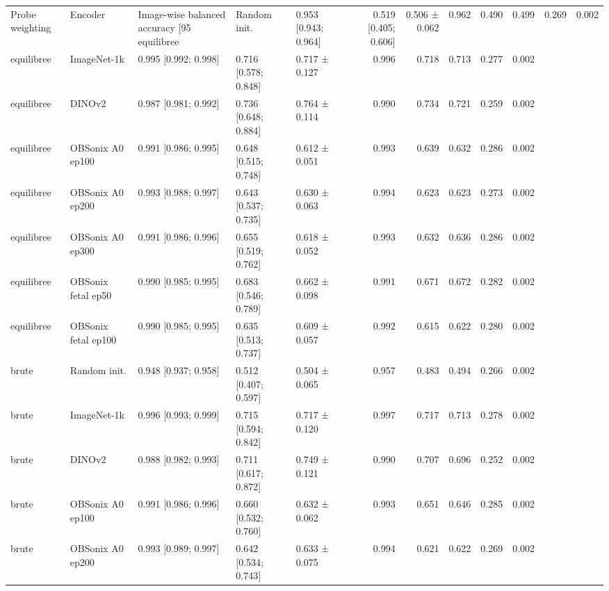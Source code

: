 \begin{tabular}{lllllrrrrr}
\toprule
Probe weighting & Encoder & Image-wise balanced accuracy [95%
\midrule
equilibree & Random init. & 0.953 [0.943; 0.964] & 0.519 [0.405; 0.606] & 0.506 ± 0.062 & 0.962 & 0.490 & 0.499 & 0.269 & 0.002 \\
equilibree & ImageNet-1k & 0.995 [0.992; 0.998] & 0.716 [0.578; 0.848] & 0.717 ± 0.127 & 0.996 & 0.718 & 0.713 & 0.277 & 0.002 \\
equilibree & DINOv2 & 0.987 [0.981; 0.992] & 0.736 [0.648; 0.884] & 0.764 ± 0.114 & 0.990 & 0.734 & 0.721 & 0.259 & 0.002 \\
equilibree & OBSonix A0 ep100 & 0.991 [0.986; 0.995] & 0.648 [0.515; 0.748] & 0.612 ± 0.051 & 0.993 & 0.639 & 0.632 & 0.286 & 0.002 \\
equilibree & OBSonix A0 ep200 & 0.993 [0.988; 0.997] & 0.643 [0.537; 0.735] & 0.630 ± 0.063 & 0.994 & 0.623 & 0.623 & 0.273 & 0.002 \\
equilibree & OBSonix A0 ep300 & 0.991 [0.986; 0.996] & 0.655 [0.519; 0.762] & 0.618 ± 0.052 & 0.993 & 0.632 & 0.636 & 0.286 & 0.002 \\
equilibree & OBSonix fetal ep50 & 0.990 [0.985; 0.995] & 0.683 [0.546; 0.789] & 0.662 ± 0.098 & 0.991 & 0.671 & 0.672 & 0.282 & 0.002 \\
equilibree & OBSonix fetal ep100 & 0.990 [0.985; 0.995] & 0.635 [0.513; 0.737] & 0.609 ± 0.057 & 0.992 & 0.615 & 0.622 & 0.280 & 0.002 \\
brute & Random init. & 0.948 [0.937; 0.958] & 0.512 [0.407; 0.597] & 0.504 ± 0.065 & 0.957 & 0.483 & 0.494 & 0.266 & 0.002 \\
brute & ImageNet-1k & 0.996 [0.993; 0.999] & 0.715 [0.594; 0.842] & 0.717 ± 0.120 & 0.997 & 0.717 & 0.713 & 0.278 & 0.002 \\
brute & DINOv2 & 0.988 [0.982; 0.993] & 0.711 [0.617; 0.872] & 0.749 ± 0.121 & 0.990 & 0.707 & 0.696 & 0.252 & 0.002 \\
brute & OBSonix A0 ep100 & 0.991 [0.986; 0.996] & 0.660 [0.532; 0.760] & 0.632 ± 0.062 & 0.993 & 0.651 & 0.646 & 0.285 & 0.002 \\
brute & OBSonix A0 ep200 & 0.993 [0.989; 0.997] & 0.642 [0.534; 0.743] & 0.633 ± 0.075 & 0.994 & 0.621 & 0.622 & 0.269 & 0.002 \\

\end{tabular}
